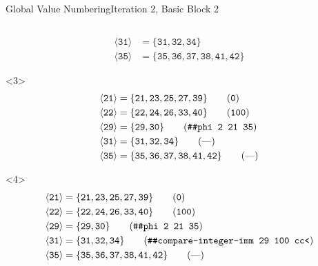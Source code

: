 \documentclass{beamer}
\newcommand{\vn}[1]{\ensuremath{\langle\texttt{#1}\rangle}}
\newcommand{\vreg}[1]{\texttt{#1}}
\begin{document}
\begin{frame}[fragile]{Global Value Numbering}{Iteration 2, Basic Block 2}
\begin{columns}[t,onlytextwidth]
\begin{column}{.5\textwidth}
\begin{onlyenv}
\begin{align*}
          \vn{31} &= \{\vreg{31},
                       \vreg{32},
                       \vreg{34}\} \tag{---} \\
          \vn{35} &= \{\vreg{35},
                       \vreg{36},
                       \vreg{37},
                       \vreg{38},
                       \vreg{41},
                       \vreg{42}\} \tag{---}
        \end{align*}
      \end{onlyenv}
      \begin{onlyenv}<3>
        \begin{align*}
          \vn{21} &= \{\vreg{21},
                       \vreg{23},
                       \vreg{25},
                       \vreg{27},
                       \vreg{39}\} \tag{\texttt{0}} \\
          \vn{22} &= \{\vreg{22},
                       \vreg{24},
                       \vreg{26},
                       \vreg{33},
                       \vreg{40}\} \tag{\texttt{100}} \\
          \vn{29} &= \{\vreg{29},
                       \vreg{30}\} \tag{\texttt{\#\#phi 2 21 35}} \\
          \vn{31} &= \{\vreg{31},
                       \vreg{32},
                       \vreg{34}\} \tag{---} \\
          \vn{35} &= \{\vreg{35},
                       \vreg{36},
                       \vreg{37},
                       \vreg{38},
                       \vreg{41},
                       \vreg{42}\} \tag{---}
        \end{align*}
      \end{onlyenv}
      \begin{onlyenv}<4>
        \begin{align*}
          \vn{21} &= \{\vreg{21},
                       \vreg{23},
                       \vreg{25},
                       \vreg{27},
                       \vreg{39}\} \tag{\texttt{0}} \\
          \vn{22} &= \{\vreg{22},
                       \vreg{24},
                       \vreg{26},
                       \vreg{33},
                       \vreg{40}\} \tag{\texttt{100}} \\
          \vn{29} &= \{\vreg{29},
                       \vreg{30}\} \tag{\texttt{\#\#phi 2 21 35}} \\
          \vn{31} &= \{\vreg{31},
                       \vreg{32},
                       \vreg{34}\} \tag{\texttt{\#\#compare-integer-imm 29 100 cc<}} \\
          \vn{35} &= \{\vreg{35},
                       \vreg{36},
                       \vreg{37},
                       \vreg{38},
                       \vreg{41},
                       \vreg{42}\} \tag{---}
        \end{align*}
      \end{onlyenv}
    \end{column}
  \end{columns}
\end{frame}
\end{document}
